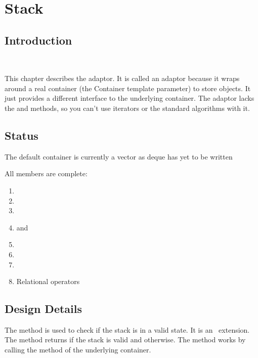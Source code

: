 
\chapter{Stack}

\section{Introduction}

\\

This chapter describes the  adaptor. It is called an adaptor
because it wraps around a real container (the Container template parameter) to
store objects. It just provides a different interface to the underlying
container. The  adaptor lacks the  and 
methods, so you can't use iterators or the standard algorithms with it.

\section{Status}

The default container is currently a vector as deque has yet to be written

All members are complete:

\begin{enumerate}
\item {}
\item {}
\item {}
\item {} and 
\item {}
\item {}
\item {}
\item Relational operators
\end{enumerate}

\section{Design Details}

The  method is used to check if the stack is in a valid state. It
is an \OW\ extension. The method returns  if the stack is valid and
 otherwise. The method works by calling the  method of
the underlying container.
 